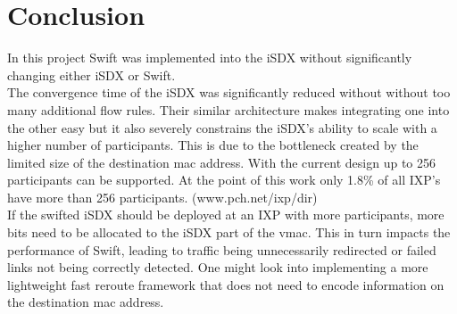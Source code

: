\chapter{\label{chapter6}Conclusion}
In this project Swift was implemented into the iSDX without significantly changing either iSDX or Swift. \\
The convergence time of the iSDX was significantly reduced without without too many additional flow rules. Their similar architecture makes integrating one into the other easy but it also severely constrains the iSDX's ability to scale with a higher number of participants. This is due to the bottleneck created by the limited size of the destination mac address. With the current design up to 256 participants can be supported. At the point of this work only 1.8\% of all IXP's have more than 256 participants. (www.pch.net/ixp/dir) \\
If the swifted iSDX should be deployed at an IXP with more participants, more bits need to be allocated to the iSDX part of the vmac. This in turn impacts the performance of Swift, leading to traffic being unnecessarily redirected or failed links not being correctly detected. One might look into implementing a more lightweight fast reroute framework that does not need to encode information on the destination mac address.
